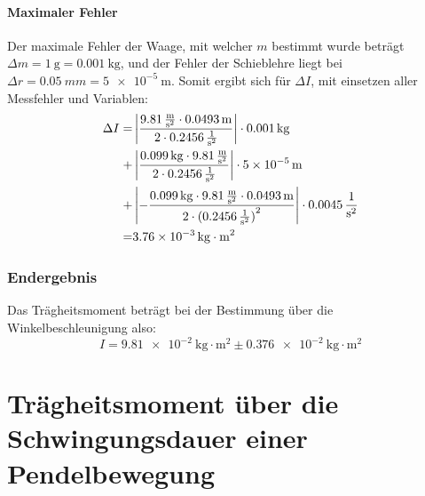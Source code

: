 \documentclass{article}
\begin{document}
				\paragraph{Maximaler Fehler}
					Der maximale Fehler der Waage, mit welcher \(m\) bestimmt wurde beträgt \(\Delta m = \SI{1}{\gram} = \SI{0.001}{\kilogram}\),
					und der Fehler der Schieblehre liegt bei \( \Delta r = \SI{0,05}{mm} = \SI{5e-5}{\metre} \).
					Somit ergibt sich für \( \Delta I \), mit einsetzen aller Messfehler und Variablen:
					\begin{equation}
						\begin{aligned}
							\Delta I =& \left| \frac{ \SI{9,81}{\frac{\metre}{\second^2}} \cdot \SI{0,0493}{\metre} }{ 2 \cdot \SI{0,2456}{\frac{1}{\second^2}} } \right| \cdot \SI{0,001}{\kilogram}\\
							+& \left| \frac{ \SI{0,099}{\kilogram} \cdot \SI{9,81}{\frac{\metre}{\second^2}} }{ 2 \cdot \SI{0,2456}{\frac{1}{\second^2}} } \right| \cdot \SI{5e-5}{\metre} \\
							+& \left| - \frac{ \SI{0,099}{\kilogram} \cdot  \SI{9,81}{\frac{\metre}{\second^2}} \cdot \SI{0,0493}{\metre} }{ 2 \cdot {(\SI{0,2456}{\frac{1}{\second^2}})}^2 } \right| \cdot \SI{0,0045}{\frac{1}{s^2}} \\
							=& \SI{3,76e-3}{ \kilogram \cdot \metre^2 }
						\end{aligned}
					\end{equation}

			\subsubsection{Endergebnis}
				Das Trägheitsmoment beträgt bei der Bestimmung über die Winkelbeschleunigung also:
				\begin{equation}
					I = \SI{9,81e-2}{ \kilogram \cdot \metre^2 } \pm \SI{0,376e-2}{ \kilogram \cdot \metre^2 }
				\end{equation}

	\section{Trägheitsmoment über die Schwingungsdauer einer Pendelbewegung}
\end{document}
